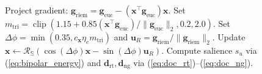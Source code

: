 \documentclass[journal]{IEEEtran}
\begin{document}
\begin{algorithm}[!t]
\begin{algorithmic}[1]
            \State Project gradient: $\mathbf{g}_{\text{riem}} = \mathbf{g}_{\text{euc}} - (\mathbf{x}^\top\mathbf{g}_{\text{euc}})\mathbf{x}$.
            \State Set $m_{\text{tri}} = \operatorname{clip}(1.15 + 0.85 (\mathbf{x}^\top\mathbf{g}_{\text{euc}})/\|\mathbf{g}_{\text{euc}}\|_2, 0.2, 2.0)$.
            \State Set $\Delta\phi = \min(0.35, c_{\mathbf{x}}\eta_e m_{\text{tri}})$ and $\mathbf{u}_R = \mathbf{g}_{\text{riem}}/\|\mathbf{g}_{\text{riem}}\|_2$.
            \State Update $\mathbf{x} \leftarrow \mathcal{R}_{\mathbb{S}}(\cos(\Delta\phi)\mathbf{x} - \sin(\Delta\phi)\mathbf{u}_R)$.
        \EndFor
    \EndFor
\EndFor
\State Compute salience $s_u$ via (\ref{eq:bipolar_energy}) and $\mathbf{d}_{\text{rt}}, \mathbf{d}_{\text{ng}}$ via (\ref{eq:doc_rt})--(\ref{eq:doc_ng}).
\end{algorithmic}
\end{algorithm}
\end{document}
